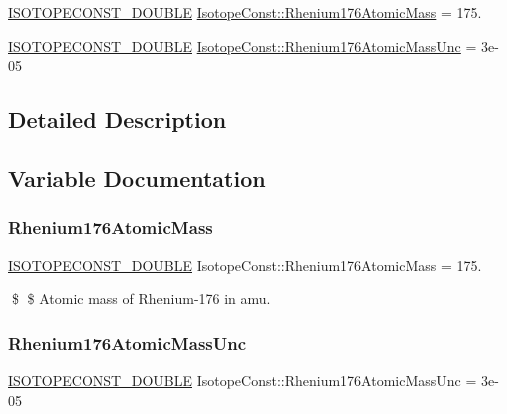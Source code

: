 \begin{DoxyCompactItemize}
\item 
\mbox{\hyperlink{group___isotope_const-_macros_ga8f45a7272ce02c0b4c65c44636ed719a}{I\+S\+O\+T\+O\+P\+E\+C\+O\+N\+S\+T\+\_\+\+D\+O\+U\+B\+LE}} \mbox{\hyperlink{group___isotope_const-_rhenium-_re176_gac35b3acc6094674d53403ee254fdf938}{Isotope\+Const\+::\+Rhenium176\+Atomic\+Mass}} = 175.
\item 
\mbox{\hyperlink{group___isotope_const-_macros_ga8f45a7272ce02c0b4c65c44636ed719a}{I\+S\+O\+T\+O\+P\+E\+C\+O\+N\+S\+T\+\_\+\+D\+O\+U\+B\+LE}} \mbox{\hyperlink{group___isotope_const-_rhenium-_re176_ga6e80b26f5ff6a8875d69892eef22042c}{Isotope\+Const\+::\+Rhenium176\+Atomic\+Mass\+Unc}} = 3e-\/05
\end{DoxyCompactItemize}


\subsection{Detailed Description}


\subsection{Variable Documentation}
\mbox{\label{group___isotope_const-_rhenium-_re176_gac35b3acc6094674d53403ee254fdf938}} 
\subsubsection{\texorpdfstring{Rhenium176\+Atomic\+Mass}{Rhenium176AtomicMass}}
{\footnotesize\ttfamily \mbox{\hyperlink{group___isotope_const-_macros_ga8f45a7272ce02c0b4c65c44636ed719a}{I\+S\+O\+T\+O\+P\+E\+C\+O\+N\+S\+T\+\_\+\+D\+O\+U\+B\+LE}} Isotope\+Const\+::\+Rhenium176\+Atomic\+Mass = 175.}

\$ \$ Atomic mass of Rhenium-\/176 in amu. \mbox{\label{group___isotope_const-_rhenium-_re176_ga6e80b26f5ff6a8875d69892eef22042c}} 
\subsubsection{\texorpdfstring{Rhenium176\+Atomic\+Mass\+Unc}{Rhenium176AtomicMassUnc}}
{\footnotesize\ttfamily \mbox{\hyperlink{group___isotope_const-_macros_ga8f45a7272ce02c0b4c65c44636ed719a}{I\+S\+O\+T\+O\+P\+E\+C\+O\+N\+S\+T\+\_\+\+D\+O\+U\+B\+LE}} Isotope\+Const\+::\+Rhenium176\+Atomic\+Mass\+Unc = 3e-\/05}

